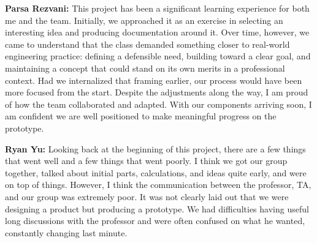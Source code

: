 \documentclass[journal, onecolumn]{IEEEtran}
\begin{document}
\vspace{1em}

\textbf{Parsa Rezvani:} This project has been a significant learning experience for both me and the team. Initially, we approached it as an exercise in selecting an interesting idea and producing documentation around it. Over time, however, we came to understand that the class demanded something closer to real-world engineering practice: defining a defensible need, building toward a clear goal, and maintaining a concept that could stand on its own merits in a professional context. Had we internalized that framing earlier, our process would have been more focused from the start. Despite the adjustments along the way, I am proud of how the team collaborated and adapted. With our components arriving soon, I am confident we are well positioned to make meaningful progress on the prototype.

\vspace{1em}

\textbf{Ryan Yu:} Looking back at the beginning of this project, there are a few things that went well and a few things that went poorly. I think we got our group together, talked about initial parts, calculations, and ideas quite early, and were on top of things. However, I think the communication between the professor, TA, and our group was extremely poor. It was not clearly laid out that we were designing a product but producing a prototype. We had difficulties having useful long discussions with the professor and were often confused on what he wanted, constantly changing last minute.
\end{document}
